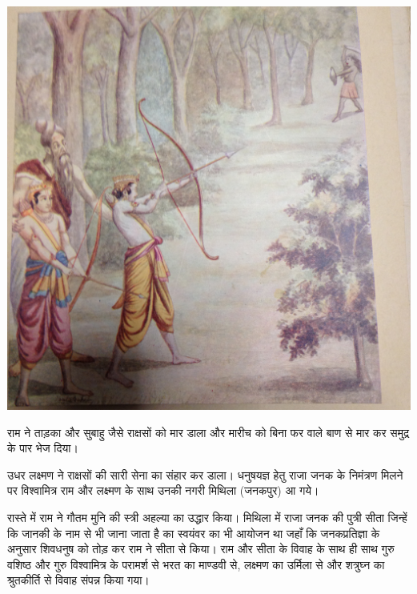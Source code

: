 \documentclass[makeidx, 10pt, oneside, onecolumn, openright, final, svgnames, dvipsnames, extrafontsizes]{memoir}
\begin{document}
\begin{center}
\includegraphics[scale=0.05]{Rama_Killing_Demon_Tataka.jpeg}
\end{center}

राम ने ताड़का और सुबाहु जैसे राक्षसों को मार डाला और मारीच को बिना फर वाले बाण से मार कर समुद्र के पार भेज दिया। 




उधर लक्ष्मण ने राक्षसों की सारी सेना का संहार कर डाला। धनुषयज्ञ हेतु राजा जनक के निमंत्रण मिलने पर विश्वामित्र राम और लक्ष्मण के साथ उनकी नगरी मिथिला (जनकपुर) आ गये।


 रास्ते में राम ने गौतम मुनि की स्त्री अहल्या का उद्धार किया। मिथिला में राजा जनक की पुत्री सीता जिन्हें कि जानकी के नाम से भी जाना जाता है का स्वयंवर का भी आयोजन था जहाँ कि जनकप्रतिज्ञा के अनुसार शिवधनुष को तोड़ कर राम ने सीता से किया। राम और सीता के विवाह के साथ ही साथ गुरु वशिष्ठ और गुरु विश्वामित्र के परामर्श से भरत का माण्डवी से, लक्ष्मण का उर्मिला से और शत्रुघ्न का श्रुतकीर्ति से विवाह संपन्न किया गया। 
 
\end{document}
